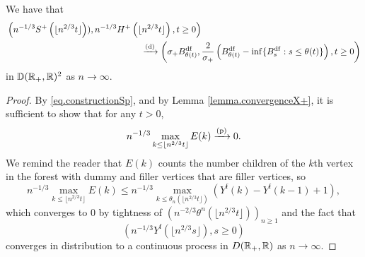 \begin{lemma}\label{lemma.subtracterrorconverges}
We have that 
\begin{align*}
& \left(n^{-1/3}S^{+}\left(\lfloor n^{2/3}t\rfloor \right)), n^{-1/3}H^{+}\left(\lfloor n^{2/3}t\rfloor \right) ,t\geq 0 \right) \\
& \hspace{15em} \todist \left(\sigma_+ B^{\mathrm{df}}_{\theta (t)},\frac{2}{\sigma_+} \left(B^{\mathrm{df}}_{\theta (t)}-\inf\{B^{\mathrm{df}}_{s}:s\leq \theta(t)\}\right) ,t\geq 0 \right)
\end{align*}
in ${\mathbb D}({\mathbb R}_+,{\mathbb R})^2$ as $n\to \infty$. 
\end{lemma}


\begin{proof}
By \cref{eq.constructionSp}, and by Lemma \ref{lemma.convergenceX+}, it is sufficient to show that for any $t>0$,
$$n^{-1/3}\max_{k\leq \lfloor n^{2/3}t\rfloor}E(k)\xrightarrow[]{\mathrm{(p)}}0.$$
We remind the reader that $E(k)$ counts the number children of the $k$th vertex in the forest with dummy and filler vertices that are filler vertices, so
$$n^{-1/3}\max_{k\leq \lfloor n^{2/3}t\rfloor}E(k)\leq n^{-1/3}\max_{k\leq \theta_n(\lfloor n^{2/3}t\rfloor)}(Y^{\mathrm{f}}(k)-Y^{\mathrm{f}}(k-1)+1),$$
which converges to $0$ by tightness of $\left(n^{-2/3}\theta^{n}(\lfloor n^{2/3}t\rfloor)\right)_{n\geq 1}$ and the fact that $$\left(n^{-1/3}Y^{\mathrm{f}}\left(\lfloor n^{2/3}s\rfloor\right),s\geq 0\right)$$ converges in distribution to a continuous process in $D({\mathbb R}_+,{\mathbb R})$ as $n\to\infty$.
\end{proof}

